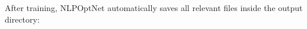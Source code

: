\documentclass[letterpaper,10pt,english,openany,oneside]{sphinxmanual}
\begin{document}
\begin{sphinxVerbatim}[commandchars=\\\{\}]
\end{sphinxVerbatim}


\sphinxAtStartPar
After training, NLPOpt\sphinxhyphen{}Net automatically saves all relevant files inside the output directory:

\sphinxAtStartPar
{}
\end{document}
